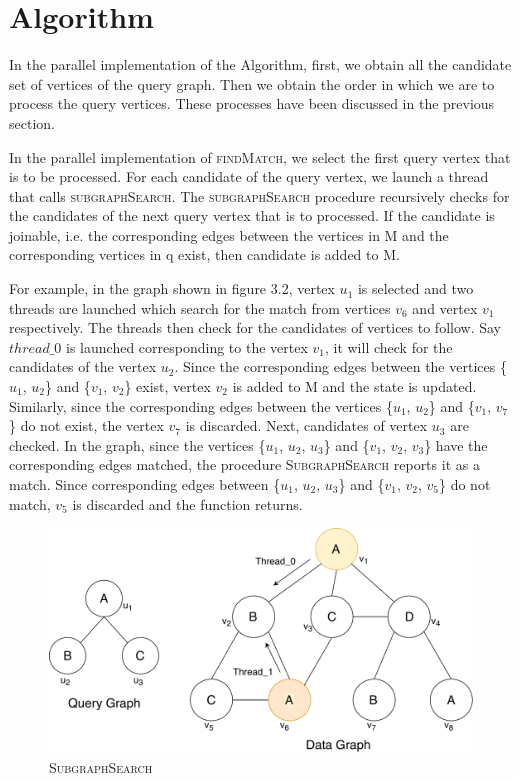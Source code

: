 \section{Algorithm}

In the parallel implementation of the Algorithm, first, we obtain all the candidate set of vertices of the query graph. Then we obtain the order in which we are to process the query vertices. These processes have been discussed in the previous section.

In the parallel implementation of \textsc{findMatch}, we select the first query vertex that is to be processed. For each candidate of the query vertex, we launch a thread that calls \textsc{subgraphSearch}. The \textsc{subgraphSearch} procedure recursively checks for the candidates of the next query vertex that is to processed. If the candidate is joinable, i.e. the corresponding edges between the vertices in M and the corresponding vertices in q exist, then candidate is added to M.

For example, in the graph shown in figure 3.2, vertex $u_1$ is selected and two threads are launched which search for the match from vertices $v_6$ and vertex $v_1$ respectively. The threads then check for the candidates of vertices to follow. Say $thread\_0$  is launched corresponding to the vertex $v_1$, it will check for the candidates of the vertex $u_2$. Since the corresponding edges between the vertices \{$u_1$, $u_2$\} and \{$v_1$, $v_2$\} exist,  vertex $v_2$ is added to M and the state is updated. Similarly, since the corresponding edges between the vertices \{$u_1$, $u_2$\} and \{$v_1$, $v_7$\} do not exist, the vertex $v_7$ is discarded. Next, candidates of vertex $u_3$ are checked. In the graph, since the vertices \{$u_1$, $u_2$, $u_3$\} and \{$v_1$, $v_2$, $v_3$\} have the corresponding edges matched, the procedure \textsc{SubgraphSearch} reports it as a match. Since corresponding edges between \{$u_1$, $u_2$, $u_3$\} and \{$v_1$, $v_2$, $v_5$\} do not match, $v_5$ is discarded and the function returns.

\begin{figure}[]
\begin{center}
        \centering
        \includegraphics[width=\textwidth]{images/Implementation_thread.pdf}
        \caption{\textsc{SubgraphSearch}}
        \label{fig:flowchart}
\end{center}
\end{figure}

